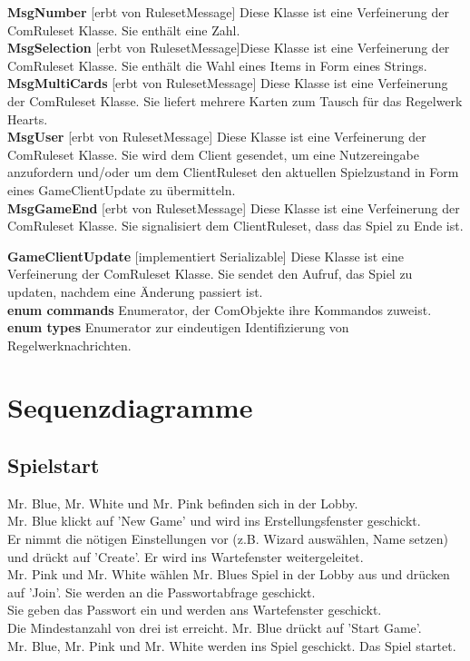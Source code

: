 \documentclass{article}
\begin{document}
\textbf{MsgNumber} [erbt von RulesetMessage] Diese Klasse ist eine Verfeinerung der ComRuleset Klasse. Sie enthält eine Zahl.\\
		
\textbf{MsgSelection} [erbt von RulesetMessage]Diese Klasse ist eine Verfeinerung der ComRuleset Klasse. Sie enthält die Wahl eines Items in Form eines Strings.\\
		
\textbf{MsgMultiCards} [erbt von RulesetMessage] Diese Klasse ist eine Verfeinerung der ComRuleset Klasse. Sie liefert mehrere Karten zum Tausch für das Regelwerk Hearts. \\
		
\textbf{MsgUser} [erbt von RulesetMessage] Diese Klasse ist eine Verfeinerung der ComRuleset Klasse. Sie wird dem Client gesendet, um eine Nutzereingabe anzufordern und/oder um dem ClientRuleset den aktuellen Spielzustand in Form eines GameClientUpdate zu übermitteln. \\

\textbf{MsgGameEnd} [erbt von RulesetMessage] Diese Klasse ist eine Verfeinerung der ComRuleset Klasse. Sie signalisiert dem ClientRuleset, dass das Spiel zu Ende ist.
		
\textbf{GameClientUpdate} [implementiert Serializable] Diese Klasse ist eine Verfeinerung der ComRuleset Klasse. Sie sendet den Aufruf, das Spiel zu updaten, nachdem eine Änderung passiert ist. \\
		
\textbf{enum commands} Enumerator, der ComObjekte ihre Kommandos zuweist. \\
		
\textbf{enum types} Enumerator zur eindeutigen Identifizierung von Regelwerknachrichten.
\ \\

\section{Sequenzdiagramme}
	\subsection{Spielstart}
		Mr. Blue, Mr. White und Mr. Pink befinden sich in der Lobby. \\
		Mr. Blue klickt auf 'New Game' und wird ins Erstellungsfenster geschickt. \\
		Er nimmt die nötigen Einstellungen vor (z.B. Wizard auswählen, Name setzen) und drückt auf 'Create'. Er wird ins Wartefenster weitergeleitet.\\
		Mr. Pink und Mr. White wählen Mr. Blues Spiel in der Lobby aus und drücken auf 'Join'. Sie werden an die Passwortabfrage geschickt.\\
		Sie geben das Passwort ein und werden ans Wartefenster geschickt.\\
		Die Mindestanzahl von drei ist erreicht. Mr. Blue drückt auf 'Start Game'.\\
		Mr. Blue, Mr. Pink und Mr. White werden ins Spiel geschickt. Das Spiel startet.\\
\end{document}
